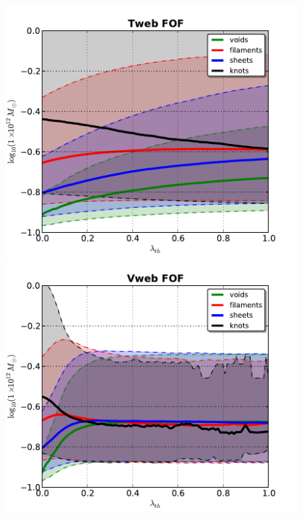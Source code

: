 \documentclass[a4,useAMS,usenatbib,usegraphicx]{latex/mn2e}
\begin{document}

 

\begin{flushleft}
\begin{figure}
\centering

  \includegraphics[trim = 0mm 0mm 0mm 0mm, clip, keepaspectratio=true,
  width=0.3\textheight]{./figures/halos_typical_mass_FOF_Tweb.pdf}
  \includegraphics[trim = 0mm 0mm 0mm 0mm, clip, keepaspectratio=true,
  width=0.3\textheight]{./figures/halos_typical_mass_FOF_Vweb.pdf}  
  

\end{figure}
\end{flushleft}
\end{document}
